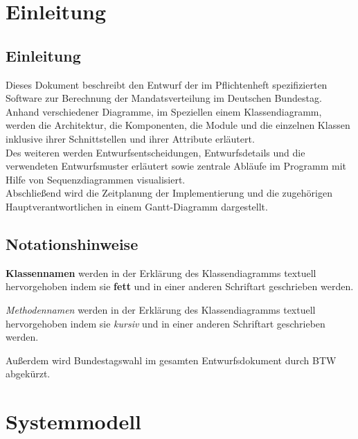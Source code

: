 \documentclass[12pt,a4paper,titlepage]{article}
\newcommand{\myma}{\fontfamily{pcr}\selectfont \textbf}
\newcommand{\mymo}{\fontfamily{pcr}\selectfont \textit}
\begin{document}
\section{Einleitung}
\subsection{Einleitung}
Dieses Dokument beschreibt den Entwurf der im Pflichtenheft spezifizierten Software zur Berechnung der Mandatsverteilung im Deutschen Bundestag.\\
Anhand verschiedener Diagramme, im Speziellen einem Klassendiagramm, werden die Architektur, die Komponenten, die Module und die einzelnen Klassen inklusive ihrer Schnittstellen und ihrer Attribute erläutert.\\
Des weiteren werden Entwurfsentscheidungen, Entwurfsdetails und die verwendeten Entwurfsmuster erläutert sowie zentrale Abläufe im Programm mit Hilfe von Sequenzdiagrammen visualisiert.\\
Abschließend wird die Zeitplanung der Implementierung und die zugehörigen Hauptverantwortlichen in einem Gantt-Diagramm dargestellt.    
\subsection{Notationshinweise}
{\myma{Klassennamen}} werden in der Erklärung des Klassendiagramms textuell hervorgehoben indem sie \textbf{fett} und in einer anderen Schriftart geschrieben werden.\newline

{\mymo{Methodennamen}} werden in der Erklärung des Klassendiagramms textuell hervorgehoben indem sie \textit{kursiv} und in einer anderen Schriftart geschrieben werden.\newline

Außerdem wird Bundestagswahl im gesamten Entwurfsdokument durch BTW abgekürzt.
\newpage

\section{Systemmodell}
\end{document}
